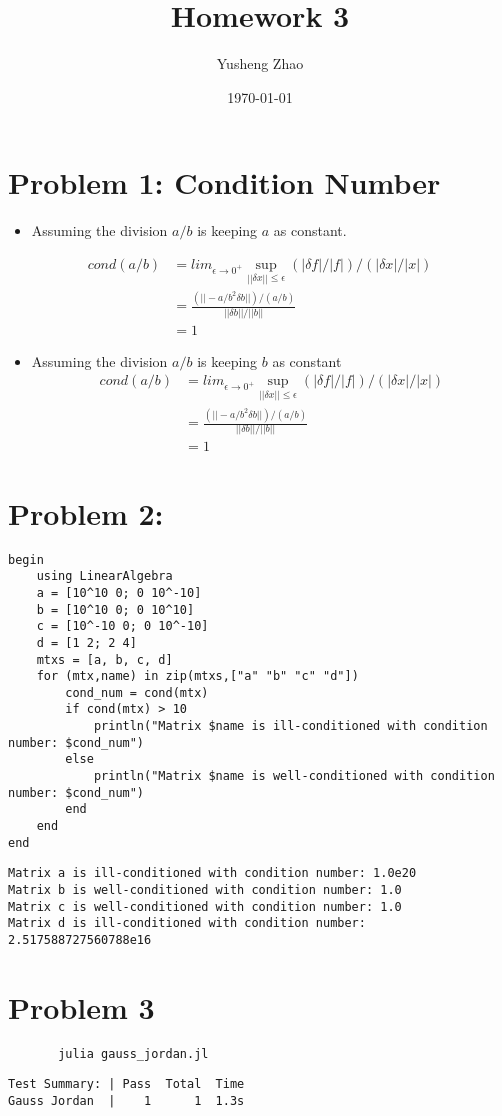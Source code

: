 \documentclass[11pt]{article}
\author{Yusheng Zhao}
\date{\today}
\title{Homework 3}
\begin{document}
\maketitle
\tableofcontents


\section{Problem 1: Condition Number}
\label{sec:orgcd07389}
\begin{itemize}
\item Assuming the division \(a/b\) is keeping \(a\) as constant.
\end{itemize}
\begin{align}
    cond(a/b) & = lim_{\epsilon \to 0^{+}} \sup_{||\delta x|| \le \epsilon}(|\delta f|/|f|) / (|\delta x|/|x|)\\
              & = \frac{ (||-a/b^{2} \delta b||)/ (a/b)}{||\delta b|| / ||b||} \\
              & = 1
\end{align}
\begin{itemize}
\item Assuming the division \(a/b\) is keeping \(b\) as constant
\begin{align}
  cond(a/b) & = lim_{\epsilon \to 0^{+}} \sup_{||\delta x|| \le \epsilon}(|\delta f|/|f|) / (|\delta x|/|x|)\\
            & = \frac{ (||-a/b^{2} \delta b||)/ (a/b)}{||\delta b|| / ||b||} \\
            & = 1
\end{align}
\end{itemize}

\section{Problem 2:}
\label{sec:org2c8ad3d}
\begin{verbatim}
begin
    using LinearAlgebra
    a = [10^10 0; 0 10^-10]
    b = [10^10 0; 0 10^10]
    c = [10^-10 0; 0 10^-10]
    d = [1 2; 2 4]
    mtxs = [a, b, c, d]
    for (mtx,name) in zip(mtxs,["a" "b" "c" "d"])
        cond_num = cond(mtx)
        if cond(mtx) > 10
            println("Matrix $name is ill-conditioned with condition number: $cond_num")
        else
            println("Matrix $name is well-conditioned with condition number: $cond_num")
        end
    end
end
\end{verbatim}

\begin{verbatim}
Matrix a is ill-conditioned with condition number: 1.0e20
Matrix b is well-conditioned with condition number: 1.0
Matrix c is well-conditioned with condition number: 1.0
Matrix d is ill-conditioned with condition number: 2.517588727560788e16
\end{verbatim}

\section{Problem 3}
\label{sec:org856313b}
\begin{verbatim}
       julia gauss_jordan.jl
\end{verbatim}

\begin{verbatim}
Test Summary: | Pass  Total  Time
Gauss Jordan  |    1      1  1.3s
\end{verbatim}
\end{document}
